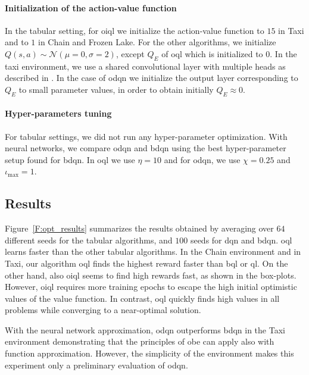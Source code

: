 \paragraph{Initialization of the action-value function} In the tabular setting, for \gls{oiql} we initialize the action-value function to $15$ in Taxi and to $1$ in Chain and Frozen Lake. For the other algorithms, we initialize $Q(s,a) \sim \mathcal{N}(\mu=0,\sigma=2)$, except $Q_E$ of \gls{oql} which is initialized to $0$.
In the taxi environment, we use a shared convolutional layer with multiple heads as described in \cite{osband2017deep}. In the case of \gls{odqn} we initialize the output layer corresponding to $Q_E$ to small parameter values, in order to obtain initially $Q_E \approx 0$. 

\paragraph{Hyper-parameters tuning} For tabular settings, we did not run any hyper-parameter optimization. With neural networks, we compare \gls{odqn} and \gls{bdqn} using the best hyper-parameter setup found for \gls{bdqn}. In \gls{oql} we use $\eta=10$ and for \gls{odqn}, we use $\chi=0.25$ and $\iota_{\max}=1$.

\setlength\figureheight{4cm}
\setlength\figurewidth{4cm}
\begin{figure*}[t]
	
	\caption[Results in Chain, Taxi and Frozen Lake]{The first row shows the average return for each tabular algorithm in the $N$-Chain, Taxi, and
	 Frozen Lake environments and for each neural network based algorithm in the Taxi and Acrobot environments
	 together with $95\%$ confidence intervals. The
     second row shows the distribution over the number of time steps before observing the maximum reward in the \gls{mdp}.}
	\label{F:opt_results}
\end{figure*}
\subsection{Results}
Figure~\ref{F:opt_results} summarizes the results obtained by averaging over $64$ different seeds for the tabular algorithms, and $100$ seeds for \gls{dqn} and \gls{bdqn}. \gls{oql} learns faster than the other tabular algorithms. In the Chain environment and in Taxi,
our algorithm \gls{oql} finds the highest reward faster than \gls{bql} or \gls{ql}. On the other hand, also \gls{oiql} seems to find
high rewards fast, as shown in the box-plots. However, \gls{oiql} requires more training epochs to escape the high initial
optimistic values of the value function. In contrast, \gls{oql} quickly finds high values in all problems while converging to a near-optimal solution.

With the neural network approximation, \gls{odqn} outperforms \gls{bdqn} in the Taxi environment demonstrating that the principles of \gls{obe} can apply also with function approximation. However, the simplicity of the environment makes this experiment only a preliminary evaluation of \gls{odqn}.
